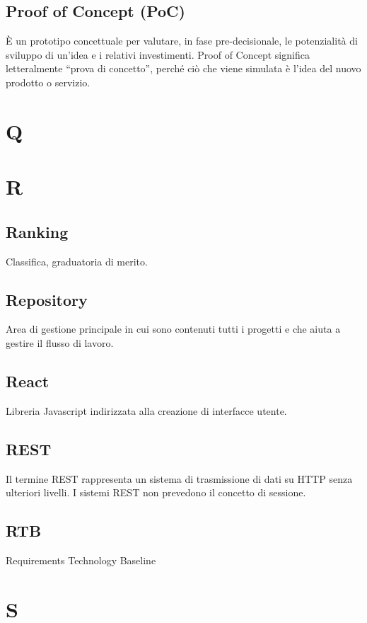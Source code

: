 \documentclass{classes/base}
\begin{document}
        \subsection*{Proof of Concept (PoC)}
        È un prototipo concettuale per valutare, in fase pre-decisionale, le potenzialità di sviluppo di un’idea e i relativi investimenti. Proof of Concept significa letteralmente “prova di concetto”, perché ciò che viene simulata è l’idea del nuovo prodotto o servizio.
        
        \newpage  
    \section{Q}
    \newpage  
    \section{R}
        \subsection*{Ranking} 
        Classifica, graduatoria di merito. 

        \subsection*{Repository}
        Area di gestione principale in cui sono contenuti tutti i progetti e che aiuta a gestire il flusso di lavoro.
        
        \subsection*{React}
        Libreria Javascript indirizzata alla creazione di interfacce utente.

        \subsection*{REST}
        Il termine REST rappresenta un sistema di trasmissione di dati su HTTP senza ulteriori livelli. I sistemi REST non prevedono il concetto di sessione.

        \subsection*{RTB}
        Requirements Technology Baseline
        \newpage  
    \section{S}
\end{document}
